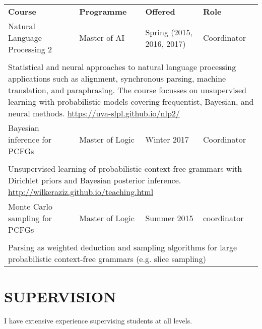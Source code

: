\begin{tabular}{l l l l }
\bf Course & \bf Programme & \bf Offered & \bf Role \\
Natural Language Processing 2 & Master of AI & Spring (2015, 2016, 2017) & Coordinator \\
& & & \\
\multicolumn{4}{p{\textwidth}}{Statistical and neural approaches to natural language processing applications such as alignment, synchronous parsing, machine translation, and paraphrasing. The course focusses on unsupervised learning with probabilistic models covering frequentist, Bayesian, and neural methods. \url{https://uva-slpl.github.io/nlp2/}} \\ \hline
Bayesian inference for PCFGs & Master of Logic & Winter 2017 & Coordinator \\
& & & \\
\multicolumn{4}{p{\textwidth}}{Unsupervised learning of probabilistic context-free grammars with Dirichlet priors and Bayesian posterior inference. \url{http://wilkeraziz.github.io/teaching.html}} \\  \hline
Monte Carlo sampling for PCFGs & Master of Logic & Summer 2015 & coordinator \\
& & & \\
\multicolumn{4}{p{\textwidth}}{Parsing as weighted deduction and sampling algorithms for large probabilistic context-free grammars (e.g. slice sampling)} \\
\end{tabular}




\section*{SUPERVISION}

I have extensive experience supervising students at all levels. 

